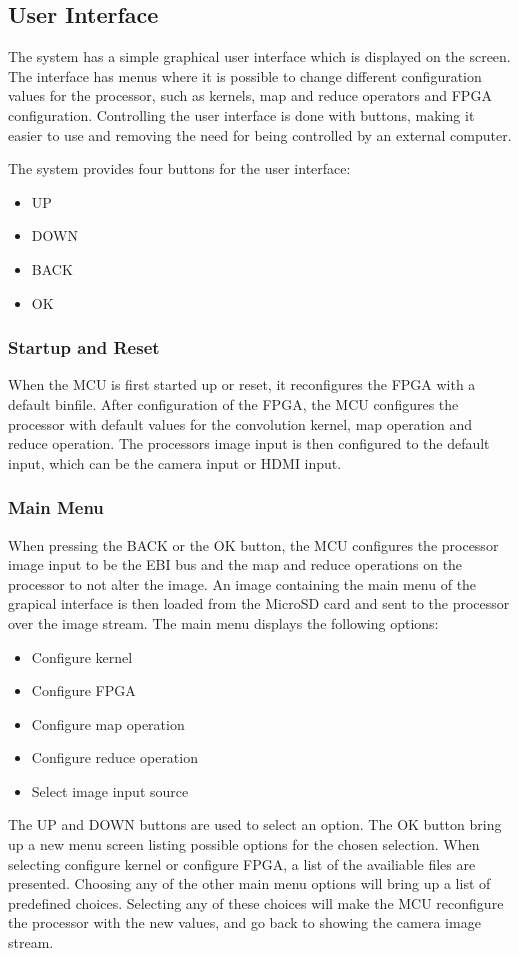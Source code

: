 \subsection{User Interface}
The system has a simple graphical user interface which is displayed on the screen. The interface has menus where it is possible to change different configuration values for the processor, such as kernels, map and reduce operators and FPGA configuration. Controlling the user interface is done with buttons, making it easier to use and removing the need for being controlled by an external computer.

The system provides four buttons for the user interface:
\begin{itemize}
	\item UP
	\item DOWN
	\item BACK
	\item OK
\end{itemize}

\subsubsection{Startup and Reset}
When the MCU is first started up or reset, it reconfigures the FPGA with a default binfile. After configuration of the FPGA, the MCU configures the processor with default values for the convolution kernel, map operation and reduce operation. The processors image input is then configured to the default input, which can be the camera input or HDMI input.

\subsubsection{Main Menu}
When pressing the BACK or the OK button, the MCU configures the processor image input to be the EBI bus and the map and reduce operations on the processor to not alter the image. An image containing the main menu of the grapical interface is then loaded from the MicroSD card and sent to the processor over the image stream. The main menu displays the following options:

\begin{itemize}
	\item Configure kernel
	\item Configure FPGA
	\item Configure map operation
	\item Configure reduce operation
	\item Select image input source
\end{itemize}

The UP and DOWN buttons are used to select an option. The OK button bring up a new menu screen listing possible options for the chosen selection. When selecting configure kernel or configure FPGA, a list of the availiable files are presented. Choosing any of the other main menu options will bring up a list of predefined choices. Selecting any of these choices will make the MCU reconfigure the processor with the new values, and go back to showing the camera image stream.


